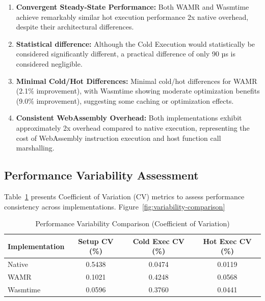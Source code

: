 \begin{enumerate}
    \item \textbf{Convergent Steady-State Performance:} Both WAMR and Wasmtime achieve remarkably similar hot execution performance 2x native overhead, despite their architectural differences.

    \item \textbf{Statistical difference:} Although the Cold Execution would statistically be considered significantly different, a practical difference of only 90 µs is considered negligible.
    
    \item \textbf{Minimal Cold/Hot Differences:} Minimal cold/hot differences for WAMR (2.1\% improvement), with Wasmtime showing moderate optimization benefits (9.0\% improvement), suggesting some caching or optimization effects.
    
    \item \textbf{Consistent WebAssembly Overhead:} Both implementations exhibit approximately 2x overhead compared to native execution, representing the cost of WebAssembly instruction execution and host function call marshalling.
\end{enumerate}

\subsection{Performance Variability Assessment}
\label{subsec:eval-execution-variability}

Table~\ref{tab:variability} presents Coefficient of Variation (CV) metrics to assess performance consistency across implementations. Figure~\ref{fig:variability-comparison}

\begin{table}[h]
    \centering
    \caption{Performance Variability Comparison (Coefficient of Variation)}
    \label{tab:variability}
    \begin{tabular}{lccc}
    \toprule
    \textbf{Implementation} & \textbf{Setup CV (\%)} & \textbf{Cold Exec CV (\%)} & \textbf{Hot Exec CV (\%)} \\
    \midrule
    Native       & 0.5438 & 0.0474 & 0.0119 \\
    WAMR         & 0.1021 & 0.4248 & 0.0568 \\
    Wasmtime     & 0.0596 & 0.3760 & 0.0441 \\
    \bottomrule
    \end{tabular}
\end{table}

